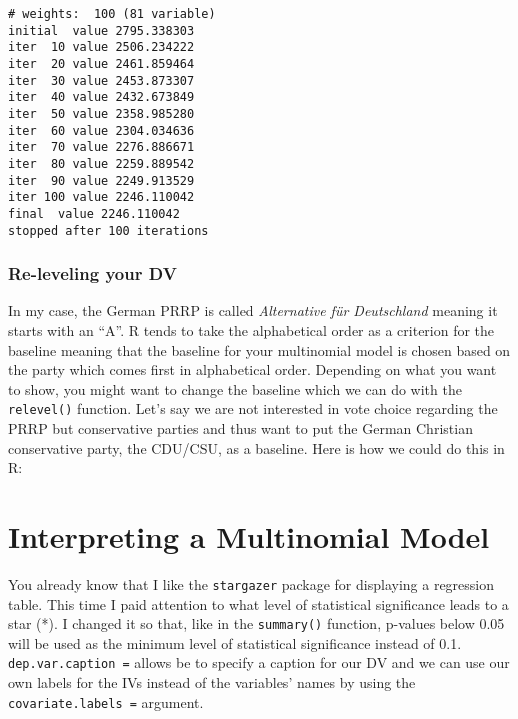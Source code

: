 \documentclass[
  letterpaper,
  DIV=11,
  numbers=noendperiod]{scrreprt}
\newenvironment{Shaded}{\begin{snugshade}}{\end{snugshade}}
\newcommand{\AttributeTok}[1]{\textcolor[rgb]{0.40,0.45,0.13}{#1}}
\newcommand{\CommentTok}[1]{\textcolor[rgb]{0.37,0.37,0.37}{#1}}
\newcommand{\FunctionTok}[1]{\textcolor[rgb]{0.28,0.35,0.67}{#1}}
\newcommand{\NormalTok}[1]{\textcolor[rgb]{0.00,0.23,0.31}{#1}}
\newcommand{\OtherTok}[1]{\textcolor[rgb]{0.00,0.23,0.31}{#1}}
\newcommand{\SpecialCharTok}[1]{\textcolor[rgb]{0.37,0.37,0.37}{#1}}
\newcommand{\StringTok}[1]{\textcolor[rgb]{0.13,0.47,0.30}{#1}}
\begin{document}
\begin{verbatim}
# weights:  100 (81 variable)
initial  value 2795.338303 
iter  10 value 2506.234222
iter  20 value 2461.859464
iter  30 value 2453.873307
iter  40 value 2432.673849
iter  50 value 2358.985280
iter  60 value 2304.034636
iter  70 value 2276.886671
iter  80 value 2259.889542
iter  90 value 2249.913529
iter 100 value 2246.110042
final  value 2246.110042 
stopped after 100 iterations
\end{verbatim}

\hypertarget{re-leveling-your-dv}{%
\subsection{Re-leveling your DV}\label{re-leveling-your-dv}}

In my case, the German PRRP is called \emph{Alternative für Deutschland}
meaning it starts with an ``A''. R tends to take the alphabetical order
as a criterion for the baseline meaning that the baseline for your
multinomial model is chosen based on the party which comes first in
alphabetical order. Depending on what you want to show, you might want
to change the baseline which we can do with the \texttt{relevel()}
function. Let's say we are not interested in vote choice regarding the
PRRP but conservative parties and thus want to put the German Christian
conservative party, the CDU/CSU, as a baseline. Here is how we could do
this in R:

\begin{Shaded}
\end{Shaded}

\hypertarget{interpreting-a-multinomial-model}{%
\chapter{Interpreting a Multinomial
Model}\label{interpreting-a-multinomial-model}}

You already know that I like the \texttt{stargazer} package for
displaying a regression table. This time I paid attention to what level
of statistical significance leads to a star (*). I changed it so that,
like in the \texttt{summary()} function, p-values below 0.05 will be
used as the minimum level of statistical significance instead of 0.1.
\texttt{dep.var.caption\ =} allows be to specify a caption for our DV
and we can use our own labels for the IVs instead of the variables'
names by using the \texttt{covariate.labels\ =} argument.
\end{document}
